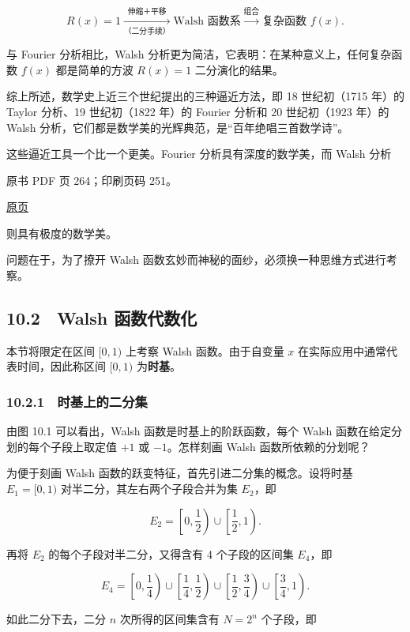 \[
R(x)=1\xrightarrow[\text{（二分手续）}]{\text{伸缩＋平移}}\text{Walsh 函数系}\xrightarrow{\text{组合}}\text{复杂函数 }f(x).
\]

与 Fourier 分析相比，Walsh 分析更为简洁，它表明：在某种意义上，任何复杂函数 \(f(x)\) 都是简单的方波 \(R(x)=1\) 二分演化的结果。

综上所述，数学史上近三个世纪提出的三种逼近方法，即 18 世纪初（1715 年）的 Taylor 分析、19 世纪初（1822 年）的 Fourier 分析和 20 世纪初（1923 年）的 Walsh 分析，它们都是数学美的光辉典范，是``百年绝唱三首数学诗''。

这些逼近工具一个比一个更美。Fourier 分析具有深度的数学美，而 Walsh 分析

\clearpage

原书 PDF 页 264；印刷页码 251。

\href{source-images/pdf-264.jpeg}{原页}

则具有极度的数学美。

问题在于，为了撩开 Walsh 函数玄妙而神秘的面纱，必须换一种思维方式进行考察。

\subsection{10.2　Walsh 函数代数化}\label{ch10-walsh-ux51fdux6570ux4ee3ux6570ux5316}

本节将限定在区间 \([0,1)\) 上考察 Walsh 函数。由于自变量 \(x\) 在实际应用中通常代表时间，因此称区间 \([0,1)\) 为\textbf{时基}。

\subsubsection{10.2.1　时基上的二分集}\label{ch10-ux65f6ux57faux4e0aux7684ux4e8cux5206ux96c6}

由图 10.1 可以看出，Walsh 函数是时基上的阶跃函数，每个 Walsh 函数在给定分划的每个子段上取定值 \(+1\) 或 \(-1\)。怎样刻画 Walsh 函数所依赖的分划呢？

为便于刻画 Walsh 函数的跃变特征，首先引进二分集的概念。设将时基 \(E_1=[0,1)\) 对半二分，其左右两个子段合并为集 \(E_2\)，即

\[
E_2=\left[0,\frac12\right)\cup\left[\frac12,1\right).
\]

再将 \(E_2\) 的每个子段对半二分，又得含有 4 个子段的区间集 \(E_4\)，即

\[
E_4=\left[0,\frac14\right)\cup\left[\frac14,\frac12\right)\cup\left[\frac12,\frac34\right)\cup\left[\frac34,1\right).
\]

如此二分下去，二分 \(n\) 次所得的区间集含有 \(N=2^n\) 个子段，即

